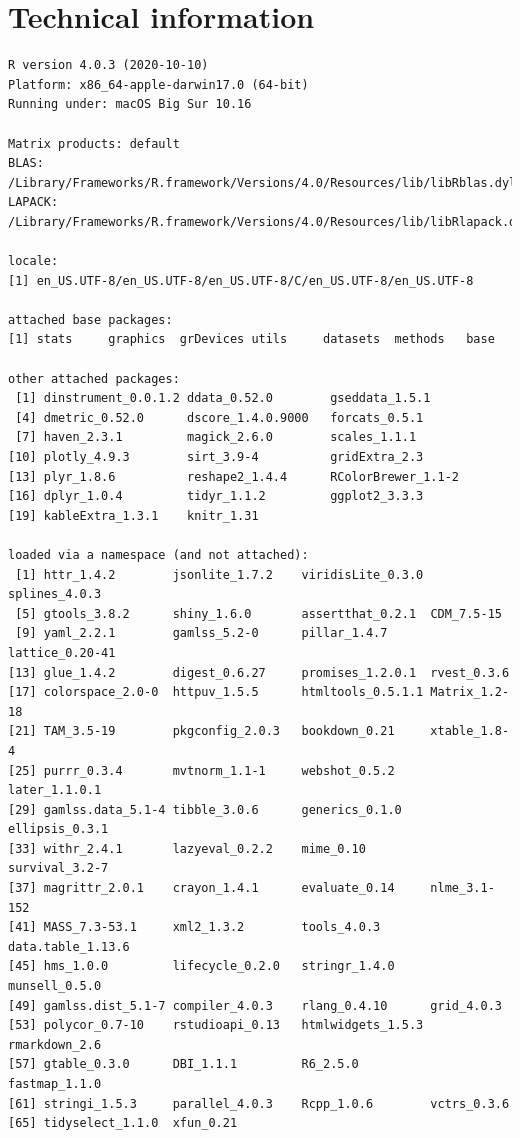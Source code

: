 \documentclass[
]{book}
\begin{document}
\hypertarget{ap:technical}{%
\chapter{Technical information}\label{ap:technical}}

\begin{verbatim}
R version 4.0.3 (2020-10-10)
Platform: x86_64-apple-darwin17.0 (64-bit)
Running under: macOS Big Sur 10.16

Matrix products: default
BLAS:   /Library/Frameworks/R.framework/Versions/4.0/Resources/lib/libRblas.dylib
LAPACK: /Library/Frameworks/R.framework/Versions/4.0/Resources/lib/libRlapack.dylib

locale:
[1] en_US.UTF-8/en_US.UTF-8/en_US.UTF-8/C/en_US.UTF-8/en_US.UTF-8

attached base packages:
[1] stats     graphics  grDevices utils     datasets  methods   base     

other attached packages:
 [1] dinstrument_0.0.1.2 ddata_0.52.0        gseddata_1.5.1     
 [4] dmetric_0.52.0      dscore_1.4.0.9000   forcats_0.5.1      
 [7] haven_2.3.1         magick_2.6.0        scales_1.1.1       
[10] plotly_4.9.3        sirt_3.9-4          gridExtra_2.3      
[13] plyr_1.8.6          reshape2_1.4.4      RColorBrewer_1.1-2 
[16] dplyr_1.0.4         tidyr_1.1.2         ggplot2_3.3.3      
[19] kableExtra_1.3.1    knitr_1.31         

loaded via a namespace (and not attached):
 [1] httr_1.4.2        jsonlite_1.7.2    viridisLite_0.3.0 splines_4.0.3    
 [5] gtools_3.8.2      shiny_1.6.0       assertthat_0.2.1  CDM_7.5-15       
 [9] yaml_2.2.1        gamlss_5.2-0      pillar_1.4.7      lattice_0.20-41  
[13] glue_1.4.2        digest_0.6.27     promises_1.2.0.1  rvest_0.3.6      
[17] colorspace_2.0-0  httpuv_1.5.5      htmltools_0.5.1.1 Matrix_1.2-18    
[21] TAM_3.5-19        pkgconfig_2.0.3   bookdown_0.21     xtable_1.8-4     
[25] purrr_0.3.4       mvtnorm_1.1-1     webshot_0.5.2     later_1.1.0.1    
[29] gamlss.data_5.1-4 tibble_3.0.6      generics_0.1.0    ellipsis_0.3.1   
[33] withr_2.4.1       lazyeval_0.2.2    mime_0.10         survival_3.2-7   
[37] magrittr_2.0.1    crayon_1.4.1      evaluate_0.14     nlme_3.1-152     
[41] MASS_7.3-53.1     xml2_1.3.2        tools_4.0.3       data.table_1.13.6
[45] hms_1.0.0         lifecycle_0.2.0   stringr_1.4.0     munsell_0.5.0    
[49] gamlss.dist_5.1-7 compiler_4.0.3    rlang_0.4.10      grid_4.0.3       
[53] polycor_0.7-10    rstudioapi_0.13   htmlwidgets_1.5.3 rmarkdown_2.6    
[57] gtable_0.3.0      DBI_1.1.1         R6_2.5.0          fastmap_1.1.0    
[61] stringi_1.5.3     parallel_4.0.3    Rcpp_1.0.6        vctrs_0.3.6      
[65] tidyselect_1.1.0  xfun_0.21        
\end{verbatim}
\end{document}
